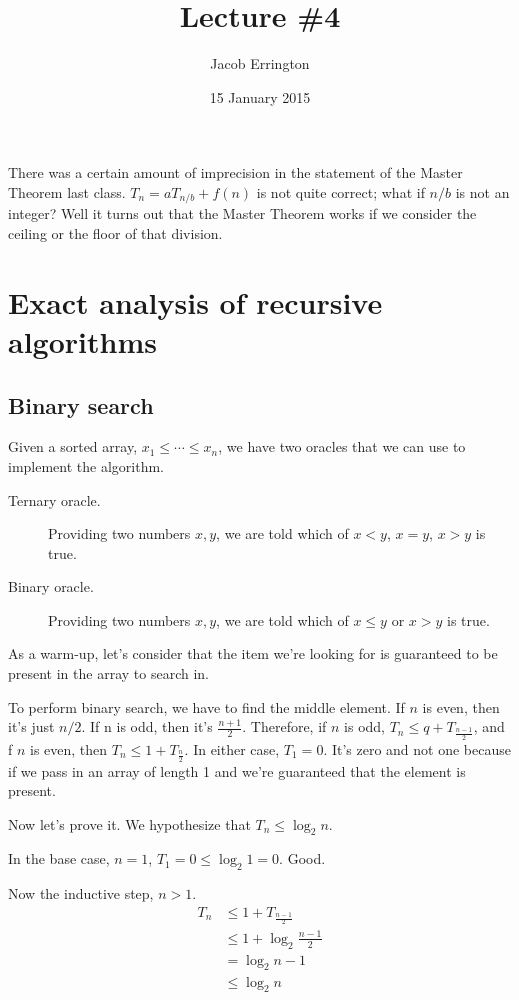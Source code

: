 \documentclass{article}
\author{Jacob Errington}
\date{15 January 2015}
\title{Lecture \#4}
\begin{document}
There was a certain amount of imprecision in the statement of the Master Theorem last class.  $T_n = a T_{n/b} + f(n)$ is not quite correct; what if $n/b$ is not an integer? Well it turns out that the Master Theorem works if we consider the ceiling or the floor of that division.

\section{Exact analysis of recursive algorithms}

\subsection{Binary search}

Given a sorted array, $x_1 \leq \cdots \leq x_n$, we have two oracles that we can use to implement the algorithm.

\begin{description}
    \item[Ternary oracle.] Providing two numbers $x, y$, we are told which of $x < y$, $x = y$, $x > y$ is true.
    \item[Binary oracle.] Providing two numbers $x, y$, we are told which of $x \leq y$ or $x > y$ is true.
\end{description}

As a warm-up, let's consider that the item we're looking for is guaranteed to be present in the array to search in.

To perform binary search, we have to find the middle element. If $n$ is even, then it's just $n/2$. If n is odd, then it's $\frac{n+1}{2}$. Therefore, if $n$ is odd, $T_n \leq q + T_{\frac{n-1}{2}}$, and f $n$ is even, then $T_n \leq 1 + T_{\frac{n}{2}}$. In either case, $T_1 = 0$. It's zero and not one because if we pass in an array of length 1 and we're guaranteed that the element is present.

Now let's prove it. We hypothesize that $T_n \leq \log_2 n$.

In the base case, $n=1$, $T_1 = 0 \leq \log_2 1 = 0$. Good.

Now the inductive step, $n>1$.
\begin{align*}
    T_n &\leq 1 + T_{\frac{n-1}{2}} \\
        &\leq 1 + \log_2{\frac{n-1}{2}} \\
        &= \log_2{n - 1} \\
        &\leq \log_2{n}
\end{align*}
\end{document}
